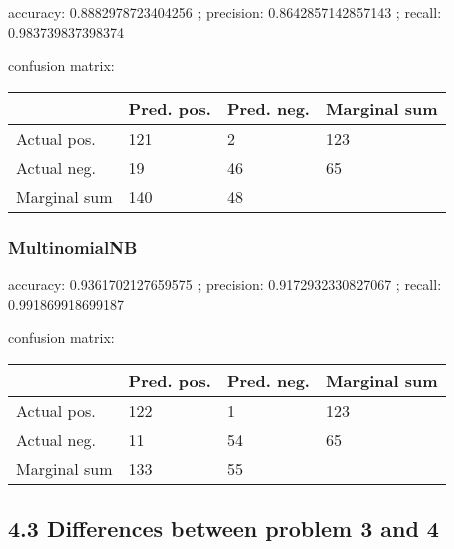 \documentclass[11pt]{article}
\begin{document}
accuracy: 0.8882978723404256 ; precision: 0.8642857142857143 ; recall:
0.983739837398374

confusion matrix:

\begin{longtable}[]{@{}llll@{}}
\toprule\noalign{}
& Pred. pos. & Pred. neg. & Marginal sum \\
\midrule\noalign{}
\endhead
\bottomrule\noalign{}
\endlastfoot
Actual pos. & 121 & 2 & 123 \\
Actual neg. & 19 & 46 & 65 \\
Marginal sum & 140 & 48 & \\
\end{longtable}

\hypertarget{multinomialnb}{%
\subsubsection{MultinomialNB}\label{multinomialnb}}

accuracy: 0.9361702127659575 ; precision: 0.9172932330827067 ; recall:
0.991869918699187

confusion matrix:

\begin{longtable}[]{@{}llll@{}}
\toprule\noalign{}
& Pred. pos. & Pred. neg. & Marginal sum \\
\midrule\noalign{}
\endhead
\bottomrule\noalign{}
\endlastfoot
Actual pos. & 122 & 1 & 123 \\
Actual neg. & 11 & 54 & 65 \\
Marginal sum & 133 & 55 & \\
\end{longtable}

\hypertarget{differences-between-problem-3-and-4}{%
\subsection{4.3 Differences between problem 3 and
4}\label{differences-between-problem-3-and-4}}
\end{document}
